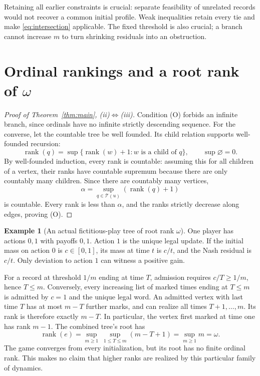 \documentclass[11pt,a4paper]{article}
\theoremstyle{definition}
\newtheorem{example}[theorem]{Example}
\DeclareMathOperator{\rank}{rank}
\begin{document}
Retaining all earlier constraints is crucial: separate feasibility of
unrelated records would not recover a common initial profile. Weak
inequalities retain every tie and make \eqref{eq:intersection} applicable.
The fixed threshold is also crucial; a branch cannot increase $m$ to
turn shrinking residuals into an obstruction.

\section{Ordinal rankings and a root rank of \texorpdfstring{$\omega$}{omega}}

\begin{proof}[Proof of Theorem~\ref{thm:main}, \textup{(ii)}$\Leftrightarrow$\textup{(iii)}]
Condition (O) forbids an infinite branch, since ordinals have no infinite
strictly descending sequence. For the converse, let the countable tree be
well founded. Its child relation supports well-founded recursion:
\begin{equation}\label{eq:rank}
 \rank(q)=\sup\{\rank(w)+1:w\text{ is a child of }q\},
 \qquad\sup\varnothing=0.
\end{equation}
By well-founded induction, every rank is countable: assuming this for all
children of a vertex, their ranks have countable supremum because there
are only countably many children. Since there are countably many vertices,
\[
 \alpha=\sup_{q\in\mathcal T(u)}(\rank(q)+1)
\]
is countable. Every rank is less than $\alpha$, and the ranks strictly
decrease along edges, proving (O).

\end{proof}

\begin{example}[An actual fictitious-play tree of root rank $\omega$]
One player has actions $0,1$ with payoffs $0,1$. Action $1$ is the unique
legal update. If the initial mass on action $0$ is $c\in[0,1]$, its mass
at time $t$ is $c/t$, and the Nash residual is $c/t$. Only deviation to
action $1$ can witness a positive gain.

For a record at threshold $1/m$ ending at time $T$, admission requires
$c/T\ge1/m$, hence $T\le m$. Conversely, every increasing list of marked
times ending at $T\le m$ is admitted by $c=1$ and the unique legal word.
An admitted vertex with last time $T$ has at most $m-T$ further marks,
and can realize all times $T+1,\ldots,m$. Its rank is therefore exactly
$m-T$. In particular, the vertex first marked at time one has rank $m-1$.
The combined tree's root has
\[
 \rank(e)=\sup_{m\ge1}\ \sup_{1\le T\le m}(m-T+1)
 =\sup_{m\ge1}m=\omega.
\]
The game converges from every initialization, but its root has no finite
ordinal rank. This makes no claim that higher ranks are realized by this
particular family of dynamics.
\end{example}
\end{document}
